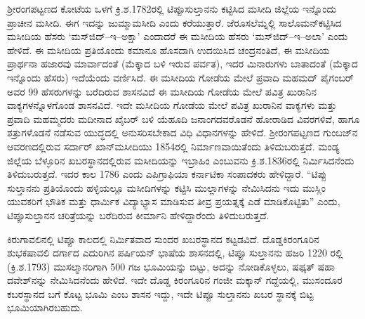 ಶ‍್ರೀರಂಗಪಟ್ಟಣದ ಕೋಟೆಯ ಒಳಗೆ ಕ್ರಿ.ಶ.1782ರಲ್ಲಿ ಟಿಪ್ಪೂಸುಲ್ತಾನನು ಕಟ್ಟಿಸಿದ ಮಸೀದಿ ಜಿಲ್ಲೆಯ ಇನ್ನೊಂದು ಪ್ರಾಚೀನ ಮಸೀದಿ. ಈಗ ಇದನ್ನು ಜುಮ್ಮಾಮಸೀದಿ ಎಂದು ಕರೆಯುತ್ತಾರೆ. ಜೆರೂಸಲೆಮ್ನಲ್ಲಿ ಸಾಲೊಮನ್​ ಕಟ್ಟಿಸಿದ ಮಸೀದಿಯ ಹೆಸರು ‘ಮಸ್​ಜಿದ್​–ಇ–ಅಕ್ಷಾ’ ಎಂದಾದರೆ ಈ ಮಸೀದಿಯ ಹೆಸರು ‘ಮಸ್​ಜಿದ್​–ಇ–ಅಲಾ’ ಎಂದು ಹೇಳಿದೆ. ಈ ಮಸೀದಿಯ ಪ್ರತಿಯೊಂದು ಕಮಾನೂ ಹೊಸದಾಗಿ ಉದಯಿಸಿದ ಚಂದ್ರನಂತಿದೆ, ಈ ಮಸೀದಿಯ ಪ್ರಾರ್ಥನಾ ಹಜಾರವು ಮಾರ್ವಾದಂತೆ (ಮೆಕ್ಕಾದ ಬಳಿ ಇರುವ ಪರ್ವತ), ಇದರ ಮಿನಾರುಗಳು ಬಾತಾದಂತೆ (ಮೆಕ್ಕಾದ ಇನ್ನೊಂದು ಹೆಸರು) ಇದೆಯೆಂದು ವರ್ಣಿಸಿದೆ. ಈ ಮಸೀದಿಯ ಗೋಡೆಯ ಮೇಲೆ ಪ್ರವಾದಿ ಮಹಮದ್​ ಪೈಗಂಬರ್​ ಅವರ 99 ಹೆಸರುಗಳನ್ನು ಬರೆದಿರುವ ಶಾಸನವಿದೆ ಈ ಮಸೀದಿಯ ಗೋಡೆಯ ಮೇಲೆ ಪವಿತ್ರ ಖುರಾನಿನ ವಾಕ್ಯಗಳನ್ನೊಳಗೊಂಡ ಶಾಸನವಿದೆ. ಇದೇ ಮಸೀದಿಯ ಗೋಡೆಯ ಮೇಲೆ ಪವಿತ್ರ ಖುರಾನಿನ ವಾಕ್ಯಗಳು ಮತ್ತು ಪ್ರವಾದಿ ಮಹಮ್ಮದರು ಮದೀನಾದ ಖೈಬರ್​ ಬಳಿ ಯೆಹೂದಿ ಜನಾಂಗದವರೊಡನೆ ಹೋರಾಡಿದ ವಿವರಗಳಿವೆ, ಹಾಗೂ ಶತ್ರುಗಳೊಡನೆ ನಡೆಸುವ ಯುದ್ಧದಲ್ಲಿ ಅನುಸರಿಸಬೇಕಾದ ವಿಧಿ ವಿಧಾನಗಳನ್ನು ಹೇಳಿದೆ. ಶ‍್ರೀರಂಗಪಟ್ಟಣದ ಗುಂಬಜ್​ನ ಆವರಣದಲ್ಲಿರುವ ಸರ್ದಾರ್​ ಖಾನ್​ ಮಸೀದಿಯು 1854ರಲ್ಲಿ ನಿರ್ಮಾಣವಾಯಿತೆಂದು ತಿಳಿದುಬರುತ್ತದೆ. ಮಂಡ್ಯ ಜಿಲ್ಲೆಯ ಬೆಳ್ಳೂರಿನ ಖಬರಸ್ಥಾನದಲ್ಲಿರುವ ಮಸೀದಿಯನ್ನು ಇಬ್ರಾಹಿಂ ಎಂಬುವನು ಕ್ರಿ.ಶ.1836ರಲ್ಲಿ ನಿರ್ಮಿಸಿದನೆಂದು ತಿಳಿದುಬರುತ್ತದೆ. ಇದರ ಕಾಲ 1786 ಎಂದು ಎಪಿಗ್ರಾಫಿಯಾ ಕರ್ನಾಟಿಕಾ ಸಂಪಾದಕರು ಹೇಳಿದ್ದಾರೆ. “ಟಿಪ್ಪು ಸುಲ್ತಾನನು ಪ್ರತಿಯೊಂದು ಹಳ್ಳಿಯಲ್ಲೂ ಮಸೀದಿಗಳನ್ನು ಕಟ್ಟಿಸಿ ಮುಲ್ಲಾಗಳನ್ನು ನೇಮಿಸಿದನು ಇದು ಮುಸ್ಲಿಂ ಯುವಕರಿಗೆ ಭೌತಿಕ ಮತ್ತು ಧಾರ್ಮಿಕ ವಿದ್ಯಾಭ್ಯಾಸ ಮಾಡಿಸುವ ತೀವ್ರ ಪ್ರಯತ್ನಕ್ಕೆ ಎಡೆ ಮಾಡಿಕೊಟ್ಟಿತು” ಎಂದು, ಟಿಪ್ಪೂಸುಲ್ತಾನನ ಚರಿತ್ರೆಯನ್ನು ಬರೆದಿರುವ ಕೀರ್ಮಾನಿ ಹೇಳಿದ್ದಾರೆಂದು ತಿಳಿದುಬರುತ್ತದೆ.

ಕಿರುಗಾವಲಿನಲ್ಲಿ ಟಿಪ್ಪೂ ಕಾಲದಲ್ಲಿ ನಿರ್ಮಿತವಾದ ಸುಂದರ ಖಬರಸ್ಥಾನದ ಕಟ್ಟಡವಿದೆ. ದೊಡ್ಡಕಿರಂಗೂರಿನ ಶುಭಕಷಾವಲಿ ದರ್ಗಾದ ಎದುರಿಗಿನ ಪರ್ಷಿಯನ್​ ಭಾಷೆಯ ಶಾಸನದಲ್ಲಿ, ಟಿಪ್ಪೂ ಸುಲ್ತಾನನು ಹಜರಿ 1220 ರಲ್ಲಿ (ಕ್ರಿ.ಶ.1793) ಮುಸಲ್ಮಾನರಿಗಾಗಿ 500 ಗಜ ಭೂಮಿಯನ್ನು ಬಿಟ್ಟು, ಅದನ್ನು ನೋಡಿಕೊಳ್ಳಲು, ಷಫ್ಕತ್​ ಷಹಾ ದವೇಶ್​ನನ್ನು ನೇಮಿಸಿದನೆಂದು ಹೇಳಿದೆ. ಇದೇ ದೊಡ್ಡ ಕಿರಂಗೂರಿನ ಗಂಜೀ ಮಕ್ಕಾನ್​ ಗದ್ದೆಯಲ್ಲಿ, ಮುಸಂದೂರ ಕಬರಸ್ಥಾನದ ಬಗೆ ಕೊಟ್ಟ ಭೂಮಿ ಎಂಬ ಶಾಸನ ಇದ್ದು, ಇದೇ ಟಿಪ್ಪೂ ಸುಲ್ತಾನನು ಖಬರ ಸ್ಥಾನಕ್ಕೆ ಬಿಟ್ಟ ಭೂಮಿಯಾಗಿರಬಹುದು.

